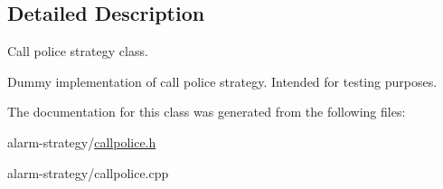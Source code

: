 \subsection{Detailed Description}
Call police strategy class. 

Dummy implementation of call police strategy. Intended for testing purposes. 

The documentation for this class was generated from the following files\+:\begin{DoxyCompactItemize}
\item 
alarm-\/strategy/\hyperlink{callpolice_8h}{callpolice.\+h}\item 
alarm-\/strategy/callpolice.\+cpp\end{DoxyCompactItemize}
